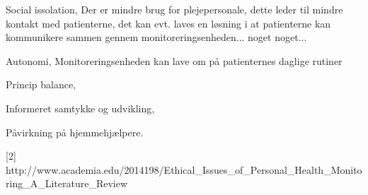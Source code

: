 Social issolation, 
Der er mindre brug for plejepersonale, dette leder til mindre kontakt med patienterne, det kan evt. laves en løsning i at patienterne kan kommunikere sammen gennem monitoreringsenheden... noget noget...

Autonomi, 
Monitoreringsenheden kan lave om på patienternes daglige rutiner

Princip balance, 


Informeret samtykke og udvikling, 


Påvirkning på hjemmehjælpere.



[2] http://www.academia.edu/2014198/Ethical_Issues_of_Personal_Health_Monitoring_A_Literature_Review 
